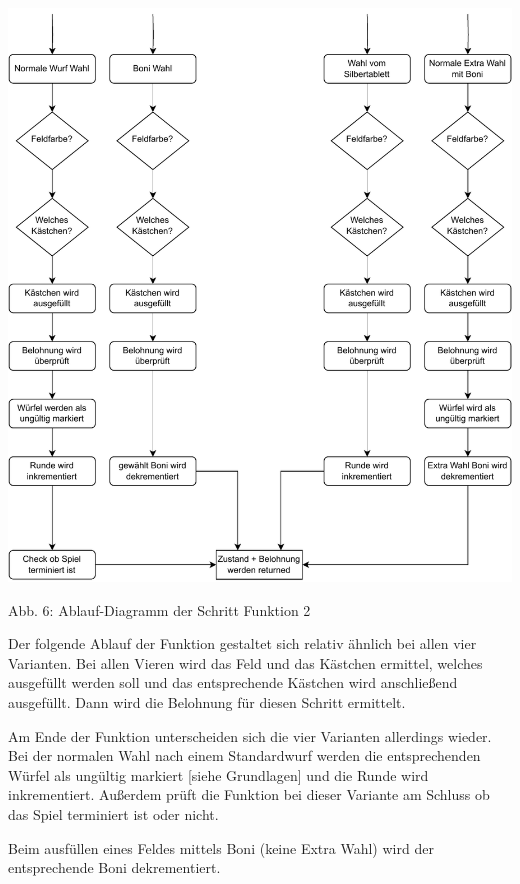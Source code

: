 \begin{minipage}{\linewidth}

	\vspace{0.5cm}
	\includegraphics[width=1\textwidth]{Bilder/step2.drawio}
	
	Abb. 6: Ablauf-Diagramm der Schritt Funktion 2 \\
\end{minipage}

Der folgende Ablauf der Funktion gestaltet sich relativ ähnlich bei allen vier Varianten. Bei allen Vieren wird das Feld und das Kästchen ermittel, welches ausgefüllt werden soll und das entsprechende Kästchen wird anschließend ausgefüllt. Dann wird die Belohnung für diesen Schritt ermittelt.

Am Ende der Funktion unterscheiden sich die vier Varianten allerdings wieder. Bei der normalen Wahl nach einem Standardwurf werden die entsprechenden Würfel als ungültig markiert [siehe Grundlagen] und die Runde wird inkrementiert. Außerdem prüft die Funktion bei dieser Variante am Schluss ob das Spiel terminiert ist oder nicht.

Beim ausfüllen eines Feldes mittels Boni (keine Extra Wahl) wird der entsprechende Boni dekrementiert.

